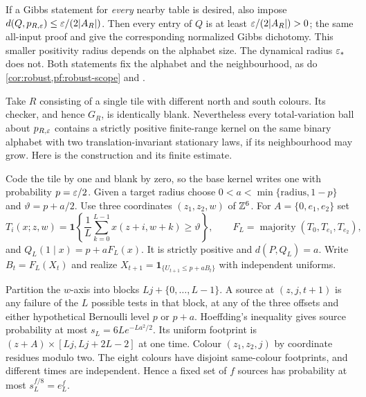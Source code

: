 If a Gibbs statement for \emph{every} nearby table is desired, also impose $d(Q,p_{R,\varepsilon})\le\varepsilon/(2|A_R|)$. Then every entry of $Q$ is at least $\varepsilon/(2|A_R|)>0$; the same all-input proof and \cite[Corollary~13.7]{DM26} give the corresponding normalized Gibbs dichotomy. This smaller positivity radius depends on the alphabet size. The dynamical radius $\varepsilon_*$ does not. Both statements fix the alphabet and the neighbourhood, as do \cref{cor:robust,pf:robust-scope} and \cite[Theorem~B.1]{DMdiagram}.

\begin{remark}\label{nw:unrestricted}
Take $R$ consisting of a single tile with different north and south colours. Its checker, and hence $G_R$, is identically blank. Nevertheless every total-variation ball about $p_{R,\varepsilon}$ contains a strictly positive finite-range kernel on the same binary alphabet with two translation-invariant stationary laws, if its neighbourhood may grow. Here is the construction and its finite estimate.

Code the tile by one and blank by zero, so the base kernel writes one with probability $p=\varepsilon/2$. Given a target radius choose $0<a<\min\{\text{radius},1-p\}$ and $\vartheta=p+a/2$. Use three coordinates $(z_1,z_2,w)$ of $\mathbb{Z}^6$. For $A=\{0,e_1,e_2\}$ set
\[
 T_i(x;z,w)=\mathbf1\left\{\frac1L\sum_{k=0}^{L-1}x(z+i,w+k)\ge\vartheta\right\},
 \qquad F_L=\operatorname{majority}(T_0,T_{e_1},T_{e_2}),
\]
and $Q_L(1\mid x)=p+aF_L(x)$. It is strictly positive and $d(P,Q_L)=a$. Write $B_t=F_L(X_t)$ and realize $X_{t+1}=\mathbf1_{\{U_{t+1}\le p+aB_t\}}$ with independent uniforms.

Partition the $w$-axis into blocks $Lj+\{0,\ldots,L-1\}$. A source at $(z,j,t+1)$ is any failure of the $L$ possible tests in that block, at any of the three offsets and either hypothetical Bernoulli level $p$ or $p+a$. Hoeffding's inequality \cite{Hoeffding63} gives source probability at most $s_L=6Le^{-La^2/2}$. Its uniform footprint is $(z+A)\times[Lj,Lj+2L-2]$ at one time. Colour $(z_1,z_2,j)$ by coordinate residues modulo two. The eight colours have disjoint same-colour footprints, and different times are independent. Hence a fixed set of $f$ sources has probability at most $s_L^{f/8}=e_L^f$.


\end{remark}
